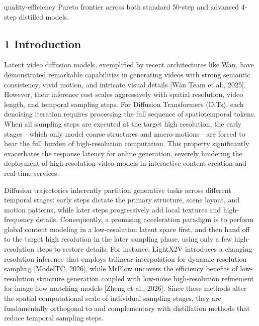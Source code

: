 quality-efficiency Pareto frontier across both standard 50-step and advanced 4-step distilled models.

\hypertarget{introduction}{%
\subsection{1 Introduction}\label{introduction}}

Latent video diffusion models, exemplified by recent architectures like Wan, have demonstrated remarkable capabilities in generating videos with strong semantic consistency, vivid motion, and intricate visual details {[}Wan Team et al., 2025{]}. However, their inference cost scales aggressively with spatial resolution, video length, and temporal sampling steps. For Diffusion Transformers (DiTs), each denoising iteration requires processing the full sequence of spatiotemporal tokens. When all sampling steps are executed at the target high resolution, the early stages---which only model coarse structures and macro-motions---are forced to bear the full burden of high-resolution computation. This property significantly exacerbates the response latency for online generation, severely hindering the deployment of high-resolution video models in interactive content creation and real-time services.

Diffusion trajectories inherently partition generative tasks across different temporal stages: early steps dictate the primary structure, scene layout, and motion patterns, while later steps progressively add local textures and high-frequency details. Consequently, a promising acceleration paradigm is to perform global content modeling in a low-resolution latent space first, and then hand off to the target high resolution in the later sampling phase, using only a few high-resolution steps to restore details. For instance, LightX2V introduces a changing-resolution inference that employs trilinear interpolation for dynamic-resolution sampling {[}ModelTC, 2026{]}, while MrFlow uncovers the efficiency benefits of low-resolution structure generation coupled with low-noise high-resolution refinement for image flow matching models {[}Zheng et al., 2026{]}. Since these methods alter the spatial computational scale of individual sampling stages, they are fundamentally orthogonal to and complementary with distillation methods that reduce temporal sampling steps.

